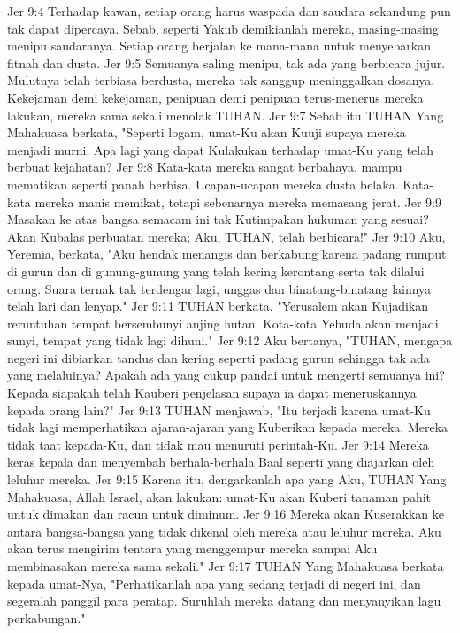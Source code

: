 Jer 9:4  Terhadap kawan, setiap orang harus waspada dan saudara sekandung pun tak dapat dipercaya. Sebab, seperti Yakub demikianlah mereka, masing-masing menipu saudaranya. Setiap orang berjalan ke mana-mana untuk menyebarkan fitnah dan dusta.
Jer 9:5  Semuanya saling menipu, tak ada yang berbicara jujur. Mulutnya telah terbiasa berdusta, mereka tak sanggup meninggalkan dosanya. Kekejaman demi kekejaman, penipuan demi penipuan terus-menerus mereka lakukan, mereka sama sekali menolak TUHAN.
Jer 9:7  Sebab itu TUHAN Yang Mahakuasa berkata, "Seperti logam, umat-Ku akan Kuuji supaya mereka menjadi murni. Apa lagi yang dapat Kulakukan terhadap umat-Ku yang telah berbuat kejahatan?
Jer 9:8  Kata-kata mereka sangat berbahaya, mampu mematikan seperti panah berbisa. Ucapan-ucapan mereka dusta belaka. Kata-kata mereka manis memikat, tetapi sebenarnya mereka memasang jerat.
Jer 9:9  Masakan ke atas bangsa semacam ini tak Kutimpakan hukuman yang sesuai? Akan Kubalas perbuatan mereka; Aku, TUHAN, telah berbicara!"
Jer 9:10  Aku, Yeremia, berkata, "Aku hendak menangis dan berkabung karena padang rumput di gurun dan di gunung-gunung yang telah kering kerontang serta tak dilalui orang. Suara ternak tak terdengar lagi, unggas dan binatang-binatang lainnya telah lari dan lenyap."
Jer 9:11  TUHAN berkata, "Yerusalem akan Kujadikan reruntuhan tempat bersembunyi anjing hutan. Kota-kota Yehuda akan menjadi sunyi, tempat yang tidak lagi dihuni."
Jer 9:12  Aku bertanya, "TUHAN, mengapa negeri ini dibiarkan tandus dan kering seperti padang gurun sehingga tak ada yang melaluinya? Apakah ada yang cukup pandai untuk mengerti semuanya ini? Kepada siapakah telah Kauberi penjelasan supaya ia dapat meneruskannya kepada orang lain?"
Jer 9:13  TUHAN menjawab, "Itu terjadi karena umat-Ku tidak lagi memperhatikan ajaran-ajaran yang Kuberikan kepada mereka. Mereka tidak taat kepada-Ku, dan tidak mau menuruti perintah-Ku.
Jer 9:14  Mereka keras kepala dan menyembah berhala-berhala Baal seperti yang diajarkan oleh leluhur mereka.
Jer 9:15  Karena itu, dengarkanlah apa yang Aku, TUHAN Yang Mahakuasa, Allah Israel, akan lakukan: umat-Ku akan Kuberi tanaman pahit untuk dimakan dan racun untuk diminum.
Jer 9:16  Mereka akan Kuserakkan ke antara bangsa-bangsa yang tidak dikenal oleh mereka atau leluhur mereka. Aku akan terus mengirim tentara yang menggempur mereka sampai Aku membinasakan mereka sama sekali."
Jer 9:17  TUHAN Yang Mahakuasa berkata kepada umat-Nya, "Perhatikanlah apa yang sedang terjadi di negeri ini, dan segeralah panggil para peratap. Suruhlah mereka datang dan menyanyikan lagu perkabungan."
